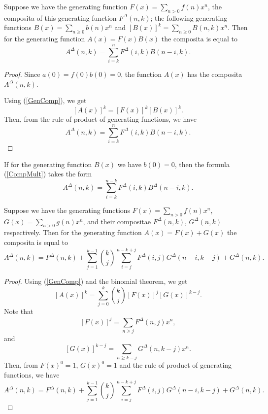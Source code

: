 \documentclass[12pt]{article}
\begin{document}
\begin{theorem} \label{Theorem_mult}
Suppose we have the generating function $F(x)=\sum_{n>0} f(n)x^n$, the composita of this generating function $F^{\Delta}(n,k)$; the following generating functions $B(x)=\sum_{n\geq 0} b(n)x^n$  and $[B(x)]^k=\sum_{n\geq 0}B(n,k)x^n$. 
Then for the generating function $A(x)=F(x)B(x)$  the composita is equal to 
\begin{equation}
\label{CompMult}
A^{\Delta}(n,k)=\sum_{i=k}^{n} F^{\Delta}(i,k)B(n-i,k).
\end{equation}
\end{theorem}

\begin{proof}
 Since $a(0)=f(0)b(0)=0$, the function $A(x)$ has the composita $A^{\Delta}(n,k)$. 
 
Using (\ref{GenComp}), we get
$$
 [A(x)]^k=[F(x)]^k[B(x)]^k.
$$ 
Then, from the rule of product of generating functions, we have
$$
A^{\Delta}(n,k)=\sum_{i=k}^{n} F^{\Delta}(i,k)B(n-i,k).
$$
\end{proof}

\begin{corollary}
If for the generating function $B(x)$ we have $b(0)=0$, then the formula (\ref{CompMult}) takes the form
\begin{equation}
A^{\Delta}(n,k)=\sum_{i=k}^{n-k} F^{\Delta}(i,k)B^{\Delta}(n-i,k).
\end{equation}
\end{corollary}

\begin{theorem} \label{Theorem_sum} 
Suppose we have the generating functions $F(x)=\sum_{n>0} f(n)x^n$, $G(x)=\sum_{n>0} g(n)x^n$, and their compositae $F^{\Delta}(n,k)$, $G^{\Delta}(n,k)$ respectively.
Then for the generating function $A(x)=F(x)+G(x)$  the composita is equal to
\begin{equation}
A^{\Delta}(n,k)=F^{\Delta}(n,k)+\sum_{j=1}^{k-1}{k\choose j}\sum_{i=j}^{n-k+j}F^{\Delta}(i,j)G^{\Delta}(n-i,k-j)+G^{\Delta}(n,k).
\end{equation}
\end{theorem}

\begin{proof}
Using (\ref{GenComp}) and the binomial theorem, we get
$$
[A(x)]^k=\sum_{j=0}^k{{k\choose j} [F(x)]^j[G(x)]^{k-j}}.
$$
Note that 
$$
[F(x)]^j=\sum_{n\geq j}F^{\Delta}(n,j)x^n,
$$
and
$$
[G(x)]^{k-j}=\sum_{n\geq k-j}G^{\Delta}(n,k-j)x^n.
$$
Then, from $F(x)^0=1$, $G(x)^0=1$ and the rule of product of generating functions, we have
$$
A^{\Delta}(n,k)=F^{\Delta}(n,k)+\sum_{j=1}^{k-1}{k\choose j}\sum_{i=j}^{n-k+j}F^{\Delta}(i,j)G^{\Delta}(n-i,k-j)+G^{\Delta}(n,k).
$$
\end{proof}
\end{document}
